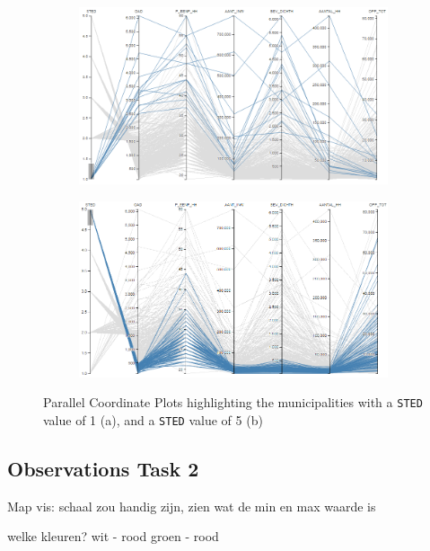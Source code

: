 \begin{figure}[h!]
    \centering
    \captionsetup{justification=centering,margin=2cm}
    \begin{subfigure}[t]{0.48\textwidth}
        \includegraphics[width=\textwidth]{img/pcp_STED1.png}
        \caption{ }
    \end{subfigure}
    \begin{subfigure}[t]{0.48\textwidth}
        \includegraphics[width=\textwidth]{img/pcp_STED5.png}
        \caption{ }
    \end{subfigure}
    \label{fig:pcp_sted}
    \caption{Parallel Coordinate Plots highlighting the municipalities with a \texttt{STED} value of 1 (a), and a \texttt{STED} value of 5 (b)}
\end{figure}

\subsection{Observations Task 2}
Map vis:
schaal zou handig zijn, zien wat de min en max waarde is

welke kleuren?
wit - rood
groen - rood
